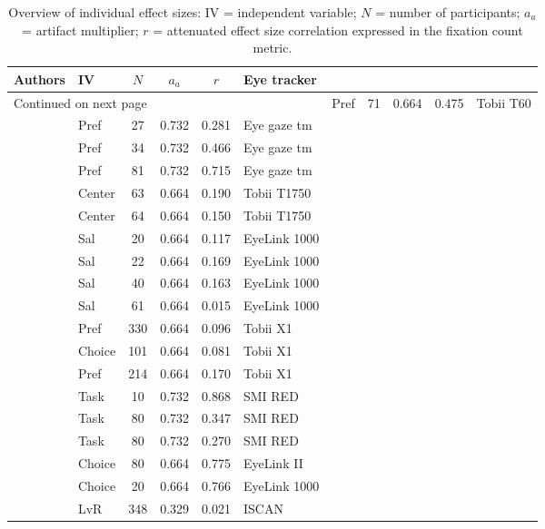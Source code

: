 \begin{longtable}{p{8cm}lcccl}
\caption{Overview of individual effect sizes: IV = independent variable; $N$ = number of participants; $a_a$ = artifact multiplier; $r$ = attenuated effect size correlation expressed in the fixation count metric.} \\ 
  \hline
Authors & IV & $N$ & $a_a$ & $r$ & Eye tracker \\ 
  \hline
\endhead
\hline
\multicolumn{6}{l}{\footnotesize Continued on next page}
\endfoot
\endlastfoot
 \hline
\cite{ares2014} & Pref & 71 & 0.664 & 0.475 & Tobii T60 \\ 
  \cite{ashby2015} & Pref & 27 & 0.732 & 0.281 & Eye gaze tm \\ 
  \cite{ashby2015} & Pref & 34 & 0.732 & 0.466 & Eye gaze tm \\ 
  \cite{ashby2015} & Pref & 81 & 0.732 & 0.715 & Eye gaze tm \\ 
  \cite{atalay2012a} & Center & 63 & 0.664 & 0.190 & Tobii T1750 \\ 
  \cite{atalay2012a} & Center & 64 & 0.664 & 0.150 & Tobii T1750 \\ 
  \cite{bagger2016} & Sal & 20 & 0.664 & 0.117 & EyeLink 1000 \\ 
  \cite{bagger2016} & Sal & 22 & 0.664 & 0.169 & EyeLink 1000 \\ 
  \cite{bagger2016} & Sal & 40 & 0.664 & 0.163 & EyeLink 1000 \\ 
  \cite{bagger2016} & Sal & 61 & 0.664 & 0.015 & EyeLink 1000 \\ 
  \cite{behe2014} & Pref & 330 & 0.664 & 0.096 & Tobii X1 \\ 
  \cite{behe2015} & Choice & 101 & 0.664 & 0.081 & Tobii X1 \\ 
  \cite{behe2017} & Pref & 214 & 0.664 & 0.170 & Tobii X1 \\ 
  \cite{bialkova2011} & Task & 10 & 0.732 & 0.868 & SMI RED \\ 
  \cite{bialkova2014a} & Task & 80 & 0.732 & 0.347 & SMI RED \\ 
  \cite{bialkova2014a} & Task & 80 & 0.732 & 0.270 & SMI RED \\ 
  \cite{brandstatter2014} & Choice & 80 & 0.664 & 0.775 & EyeLink II \\ 
  \cite{cavanagh2014} & Choice & 20 & 0.664 & 0.766 & EyeLink 1000 \\ 
  \cite{chandon2009a} & LvR & 348 & 0.329 & 0.021 & ISCAN \\ 

\end{longtable}

